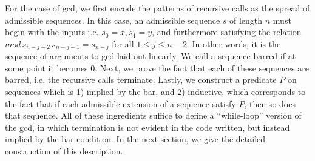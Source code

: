 For the case of gcd, we first encode the patterns of recursive calls as the spread of 
admissible sequences. In this case, an admissible sequence $s$ of length $n$ must
begin with the inputs i.e. $s_0 = x, s_1 = y$, and furthermore satisfying the relation
 $mod\,s_{n-j-2}\,s_{n-j-1} = s_{n-j}$ for all $1 \le j \le n-2$. 
In other words, it is the sequence of 
arguments to gcd laid out linearly. 
We call a sequence barred if at some point it becomes 0.
Next, we prove the fact that each of these 
sequences are barred, i.e. the recursive calls terminate. 
Lastly, we construct a predicate $P$ on sequences which is 1) implied by the bar,
and 2) inductive, which corresponds to the fact that if each 
admissible extension of a sequence satisfy $P$, then so does that sequence.
All of these ingredients suffice to define a ``while-loop'' version of the gcd, in which
termination is not evident in the code written, but instead implied by the 
bar condition. In the next section, we give the detailed construction of this
description.



